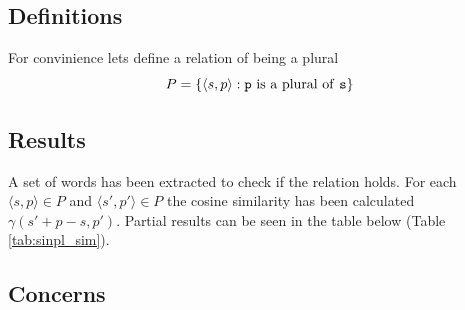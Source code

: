 \documentclass{article}
\begin{document}
  \subsection{Definitions}
  For convinience lets define a relation of being a plural
  \begin{equation}
    P = \{\langle s, p \rangle : \textrm{\texttt{p} is a plural of \texttt{s}} \}
  \end{equation}

  \subsection{Results}
  A set of words has been extracted to check if the relation holds. For each
  $\langle s, p \rangle \in P$ and $\langle s', p' \rangle \in P$ the cosine
  similarity has been calculated $\gamma(s' + p - s, p')$. Partial
  results can be seen in the table below (Table \ref{tab:sinpl_sim}).

  \begin{table}[ht]
  \center
  \caption{Cosine similarity between plural and generated plural forms}
  \label{tab:sinpl_sim}
  \end{table}

  \subsection{Concerns}
\end{document}
